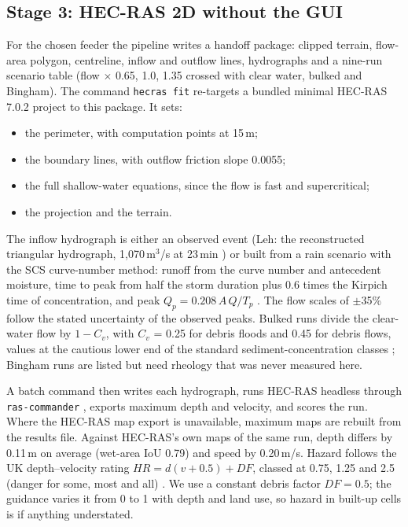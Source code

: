 \documentclass[sigconf,nonacm]{acmart}
\begin{document}
\subsection{Stage 3: HEC-RAS 2D without the GUI}
For the chosen feeder the pipeline writes a handoff package: clipped terrain, flow-area polygon, centreline, inflow and outflow lines, hydrographs and a nine-run scenario table (flow $\times$ 0.65, 1.0, 1.35 crossed with clear water, bulked and Bingham). The command \texttt{hecras fit} re-targets a bundled minimal HEC-RAS 7.0.2 project to this package. It sets:
\begin{itemize}
  \item the perimeter, with computation points at 15\,m;
  \item the boundary lines, with outflow friction slope 0.0055;
  \item the full shallow-water equations, since the flow is fast and supercritical;
  \item the projection and the terrain.
\end{itemize}
The inflow hydrograph is either an observed event (Leh: the reconstructed triangular hydrograph, 1,070\,m$^3$/s at 23\,min \cite{thayyen2013}) or built from a rain scenario with the SCS curve-number method: runoff from the curve number and antecedent moisture, time to peak from half the storm duration plus 0.6 times the Kirpich time of concentration, and peak $Q_p = 0.208\,A\,Q/T_p$ \cite{chow1988,kirpich1940}. The flow scales of $\pm$35\% follow the stated uncertainty of the observed peaks. Bulked runs divide the clear-water flow by $1 - C_v$, with $C_v$ = 0.25 for debris floods and 0.45 for debris flows, values at the cautious lower end of the standard sediment-concentration classes \cite{obrien1988}; Bingham runs are listed but need rheology that was never measured here.

A batch command then writes each hydrograph, runs HEC-RAS headless through \texttt{ras-commander} \cite{rascommander}, exports maximum depth and velocity, and scores the run. Where the HEC-RAS map export is unavailable, maximum maps are rebuilt from the results file. Against HEC-RAS's own maps of the same run, depth differs by 0.11\,m on average (wet-area IoU 0.79) and speed by 0.20\,m/s. Hazard follows the UK depth--velocity rating $HR = d(v + 0.5) + DF$, classed at 0.75, 1.25 and 2.5 (danger for some, most and all) \cite{fd2321}. We use a constant debris factor $DF = 0.5$; the guidance varies it from 0 to 1 with depth and land use, so hazard in built-up cells is if anything understated.
\end{document}
